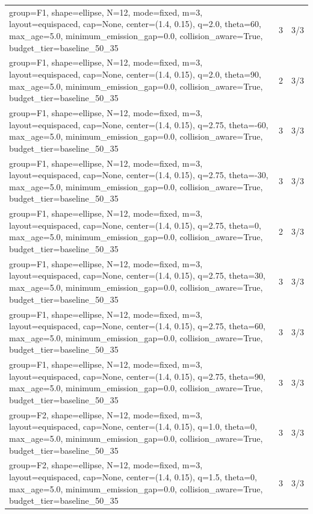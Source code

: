 \begin{tabular}{p{11cm}rr}
group=F1, shape=ellipse, N=12, mode=fixed, m=3, layout=equispaced, cap=None, center=(1.4, 0.15), q=2.0, theta=60, max\_age=5.0, minimum\_emission\_gap=0.0, collision\_aware=True, budget\_tier=baseline\_50\_35 & 3 & 3/3 \\
group=F1, shape=ellipse, N=12, mode=fixed, m=3, layout=equispaced, cap=None, center=(1.4, 0.15), q=2.0, theta=90, max\_age=5.0, minimum\_emission\_gap=0.0, collision\_aware=True, budget\_tier=baseline\_50\_35 & 2 & 3/3 \\
group=F1, shape=ellipse, N=12, mode=fixed, m=3, layout=equispaced, cap=None, center=(1.4, 0.15), q=2.75, theta=-60, max\_age=5.0, minimum\_emission\_gap=0.0, collision\_aware=True, budget\_tier=baseline\_50\_35 & 3 & 3/3 \\
group=F1, shape=ellipse, N=12, mode=fixed, m=3, layout=equispaced, cap=None, center=(1.4, 0.15), q=2.75, theta=-30, max\_age=5.0, minimum\_emission\_gap=0.0, collision\_aware=True, budget\_tier=baseline\_50\_35 & 3 & 3/3 \\
group=F1, shape=ellipse, N=12, mode=fixed, m=3, layout=equispaced, cap=None, center=(1.4, 0.15), q=2.75, theta=0, max\_age=5.0, minimum\_emission\_gap=0.0, collision\_aware=True, budget\_tier=baseline\_50\_35 & 2 & 3/3 \\
group=F1, shape=ellipse, N=12, mode=fixed, m=3, layout=equispaced, cap=None, center=(1.4, 0.15), q=2.75, theta=30, max\_age=5.0, minimum\_emission\_gap=0.0, collision\_aware=True, budget\_tier=baseline\_50\_35 & 3 & 3/3 \\
group=F1, shape=ellipse, N=12, mode=fixed, m=3, layout=equispaced, cap=None, center=(1.4, 0.15), q=2.75, theta=60, max\_age=5.0, minimum\_emission\_gap=0.0, collision\_aware=True, budget\_tier=baseline\_50\_35 & 3 & 3/3 \\
group=F1, shape=ellipse, N=12, mode=fixed, m=3, layout=equispaced, cap=None, center=(1.4, 0.15), q=2.75, theta=90, max\_age=5.0, minimum\_emission\_gap=0.0, collision\_aware=True, budget\_tier=baseline\_50\_35 & 3 & 3/3 \\
group=F2, shape=ellipse, N=12, mode=fixed, m=3, layout=equispaced, cap=None, center=(1.4, 0.15), q=1.0, theta=0, max\_age=5.0, minimum\_emission\_gap=0.0, collision\_aware=True, budget\_tier=baseline\_50\_35 & 3 & 3/3 \\
group=F2, shape=ellipse, N=12, mode=fixed, m=3, layout=equispaced, cap=None, center=(1.4, 0.15), q=1.5, theta=0, max\_age=5.0, minimum\_emission\_gap=0.0, collision\_aware=True, budget\_tier=baseline\_50\_35 & 3 & 3/3 \\

\end{tabular}
